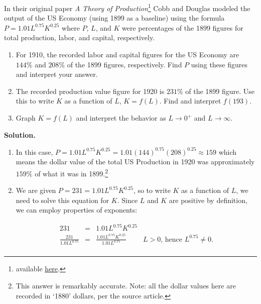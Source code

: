 \documentclass{ximera}
\begin{document}
\begin{example} \label{CobbDouglasEx}  In their original paper \textit{A Theory of Production}\footnote{available \href{http://bit.ly/2dxlstt}{\underline{here}}.} Cobb and Douglas modeled the output of the US Economy (using 1899 as a baseline) using the formula $P = 1.01 L^{0.75} K^{0.25}$ where $P$, $L$, and $K$ were percentages of the 1899 figures for total production, labor, and capital, respectively.

\begin{enumerate}

\item  For 1910, the recorded labor and capital figures for the US Economy are $144 \%$ and $208 \%$ of the 1899 figures, respectively.  Find $P$ using these figures and interpret your answer.

\item  The recorded production value figure for 1920 is $231 \%$ of the 1899 figure.  Use this to write $K$ as a function of $L$, $K = f(L)$.  Find and interpret $f(193)$.

\item  Graph $K = f(L)$ and interpret the behavior as $L \rightarrow 0^{+}$ and $L \rightarrow \infty$.


\end{enumerate}

{\bf Solution.}

\begin{enumerate}

\item  In this case, $P = 1.01 L^{0.75} K^{0.25} = 1.01 (144)^{0.75} (208)^{0.25} \approx 159$ which means the dollar value of the total US Production in 1920 was approximately $159 \%$ of what it was in 1899.\footnote{This answer is remarkably accurate. Note:  all the dollar values here are recorded in `1880' dollars, per the source article. }  


\item We are given $P = 231 = 1.01L^{0.75} K^{0.25}$, so to write $K$ as a function of $L$, we need to solve this equation for $K$.  Since $L$ and $K$ are positive by definition, we can employ properties of exponents:

\[ \begin{array}{rclr}

231 & = & 1.01 L^{0.75} K^{0.25} & \\

\frac{231}{1.01 L^{0.75}} & = &  \frac{1.01 L^{0.75} K^{0.25}}{1.01 L^{0.75}} & \text{$L>0$, hence $L^{0.75} \neq 0$.}\\


\end{array}\]
\end{enumerate}
\end{example}
\end{document}
